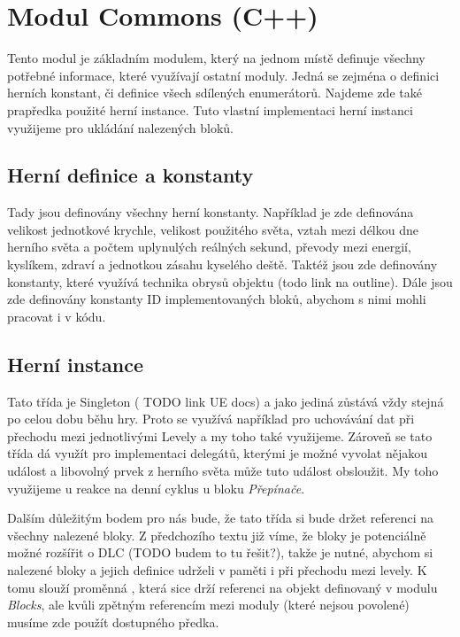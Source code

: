 
\section{Modul Commons (C++)}

Tento modul je základním modulem, který na jednom místě definuje všechny potřebné informace, které využívají ostatní moduly. Jedná se zejména o definici herních konstant, či definice všech sdílených enumerátorů. Najdeme zde také prapředka použité herní instance. Tuto vlastní implementaci herní instanci využijeme pro ukládání nalezených bloků.

\subsection{Herní definice a konstanty}


Tady jsou definovány všechny herní konstanty. Například je zde definována velikost jednotkové krychle, velikost použitého světa, vztah mezi délkou dne herního světa a počtem uplynulých reálných sekund, převody mezi energií, kyslíkem, zdraví a jednotkou zásahu kyselého deště. Taktéž jsou zde definovány konstanty, které využívá technika obrysů objektu (todo link na outline). Dále jsou zde definovány konstanty ID implementovaných bloků, abychom s nimi mohli pracovat i v kódu.

\subsection{Herní instance}

Tato třída je Singleton ( TODO link UE docs) a jako jediná zůstává vždy stejná po celou dobu běhu hry. Proto se využívá například pro uchovávání dat při přechodu mezi jednotlivými Levely a my toho také využijeme. Zároveň se tato třída dá využít pro implementaci delegátů, kterými je možné vyvolat nějakou událost a libovolný prvek z herního světa může tuto událost obsloužit. My toho využijeme u reakce na denní cyklus u bloku \textit{Přepínače}.

Dalším důležitým bodem pro nás bude, že tato třída si bude držet referenci na všechny nalezené bloky. Z předchozího textu již víme, že bloky je potenciálně možné rozšířit o DLC (TODO budem to tu řešit?), takže je nutné, abychom si nalezené bloky a jejich definice udrželi v paměti i při přechodu mezi levely. K tomu slouží proměnná  , která sice  drží referenci na objekt definovaný v modulu \textit{Blocks}, ale kvůli zpětným referencím mezi moduly (které nejsou povolené) musíme zde použít dostupného předka.


